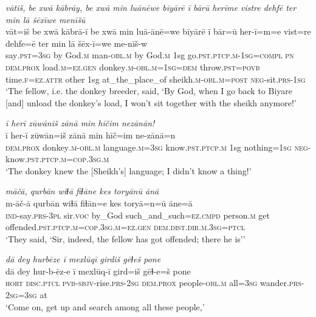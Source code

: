 \ea \label{HB.67}
\textit{vātiš, be xwā kābrāy, be xwā min luānēwe bīyārē ī bārū herīme vistre dehfē ter min lā šēxīwe menīšū} \\ 
\gll vāt=iš be xwā kābrā-ī be xwā min luā-ānē=we bīyārē ī bār=ū her-ī=m=e vist=re dehfe=ē ter min lā šēx-ī=we me-nīš-w \\ 
 say\textsc{.pst}\textsc{=3sg} by God\textsc{.m} man\textsc{-obl}\textsc{.m} by God\textsc{.m} 1sg go\textsc{.pst}\textsc{.ptcp}\textsc{.m}\textsc{-1sg}\textsc{=\textsc{compl}} \textsc{pn} \textsc{dem.prox} load\textsc{.m}\textsc{=ez}\textsc{.gen} donkey\textsc{.m}\textsc{-obl}\textsc{.m}\textsc{=1sg}\textsc{=dem} throw\textsc{.pst}\textsc{=\textsc{povb}} time\textsc{\textsc{.f}}\textsc{=ez}.\textsc{attr} other 1sg at\_the\_place\_of sheikh\textsc{.m}\textsc{-obl}\textsc{.m}\textsc{=\textsc{post}} \textsc{neg-}sit\textsc{.prs}\textsc{-1sg} \\ 
\glt `The fellow, i.e. the donkey breeder, said, ‘By God, when I go back to Biyare [and] unload the donkey’s load, I won’t sit together with the sheikh anymore!'
\z 
 
\ea \label{HB.71}
\textit{ī herī zūwāniš zānā min hīčim nezānān!} \\ 
\gll ī her-ī zūwān=iš zānā min hīč=im ne-zānā=n \\ 
 \textsc{dem.prox} donkey\textsc{.m}\textsc{-obl}\textsc{.m} language\textsc{.m}\textsc{=3sg} know\textsc{.pst}\textsc{.ptcp}\textsc{.m} 1sg nothing\textsc{=1sg} \textsc{neg-}know\textsc{.pst}\textsc{.ptcp}\textsc{.m}\textsc{=cop}\textsc{.3sg}\textsc{.m} \\ 
\glt `The donkey knew the [Sheikh’s] language; I didn’t know a thing!'
\z 
 
\ea \label{HB.76}
\textit{māčā, qurbān wiɫā fiɫāne kes toryānū ānā} \\ 
\gll m-āč-ā qurbān wiɫā fiɫān=e kes toryā=n=ū āne=ā \\ 
 \textsc{ind-}say\textsc{.prs}\textsc{-3pl} sir.\textsc{voc} by\_God such\_and\_such\textsc{=ez}\textsc{.cmpd} person\textsc{.m} get offended\textsc{.pst}\textsc{.ptcp}\textsc{.m}\textsc{=cop}\textsc{.3sg}\textsc{.m}\textsc{=ez}\textsc{.gen} \textsc{dem.dist}\textsc{.dir}\textsc{.m}\textsc{.3sg}=\textsc{ptcl} \\ 
\glt `They said, ‘Sir, indeed, the fellow has got offended; there he is’'
\z 
 
\ea \label{HB.90}
\textit{dā dey hurbēze ī mexlūqī girdiš gēɫeš pone} \\ 
\gll dā dey hur-b-ēz-e ī mexlūq-ī gird=iš gēɫ-e=š pone \\ 
 \textsc{hort} \textsc{disc.ptcl} \textsc{pvb-}\textsc{sbjv-}rise\textsc{.prs}-\textsc{2sg} \textsc{dem.prox} people\textsc{-obl}\textsc{.m} all\textsc{=3sg} wander\textsc{.prs}-\textsc{2sg}\textsc{=3sg} at \\ 
\glt `Come on, get up and search among all these people,'
\z 
 
